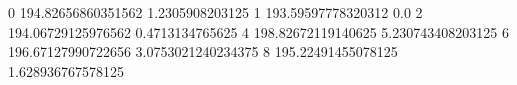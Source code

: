 0 194.82656860351562 1.2305908203125
1 193.59597778320312 0.0
2 194.06729125976562 0.4713134765625
4 198.82672119140625 5.230743408203125
6 196.67127990722656 3.0753021240234375
8 195.22491455078125 1.628936767578125
